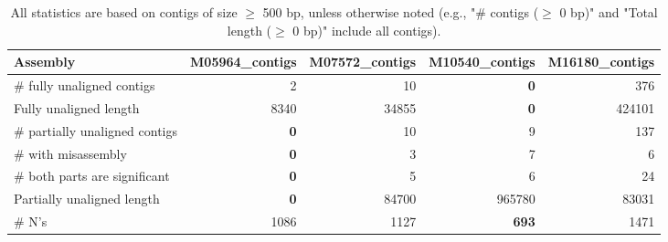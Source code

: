 \documentclass[12pt,a4paper]{article}
\begin{document}
\begin{table}[ht]
\begin{center}
\caption{All statistics are based on contigs of size $\geq$ 500 bp, unless otherwise noted (e.g., "\# contigs ($\geq$ 0 bp)" and "Total length ($\geq$ 0 bp)" include all contigs).}
\begin{tabular}{|l*{4}{|r}|}
\hline
Assembly & M05964\_contigs & M07572\_contigs & M10540\_contigs & M16180\_contigs \\ \hline
\# fully unaligned contigs & 2 & 10 & {\bf 0} & 376 \\ \hline
Fully unaligned length & 8340 & 34855 & {\bf 0} & 424101 \\ \hline
\# partially unaligned contigs & {\bf 0} & 10 & 9 & 137 \\ \hline
\hspace{5mm}\# with misassembly & {\bf 0} & 3 & 7 & 6 \\ \hline
\hspace{5mm}\# both parts are significant & {\bf 0} & 5 & 6 & 24 \\ \hline
Partially unaligned length & {\bf 0} & 84700 & 965780 & 83031 \\ \hline
\# N's & 1086 & 1127 & {\bf 693} & 1471 \\ \hline
\end{tabular}
\end{center}
\end{table}
\end{document}
